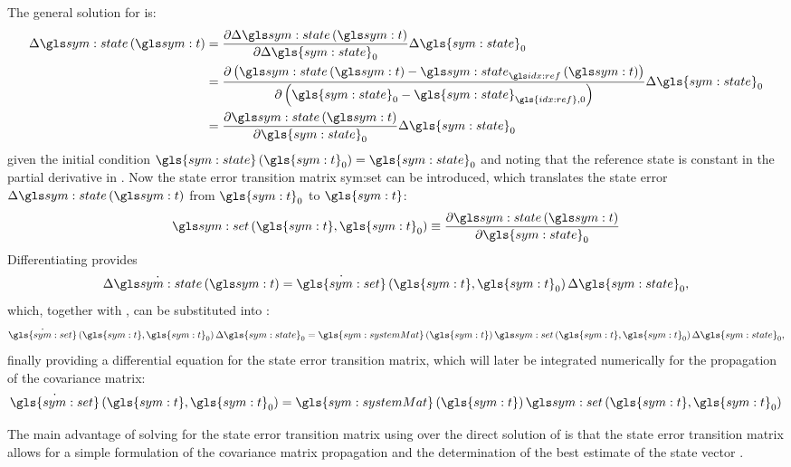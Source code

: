 The general solution for  is:
\begin{align}
 \Delta \xt &= \frac{\partial \Delta \xt}{\partial \Delta\gls{sym:state}_0} \Delta \gls{sym:state}_0 \\
            &= \frac{\partial \left(\xt - \xref\right)}{\partial \left(\gls{sym:state}_0 - \gls{sym:state}_{\gls{idx:ref},0}\right)} \Delta \gls{sym:state}_0 
\label{eq:ref-constant}\\
            &= \frac{\partial \xt}{\partial \gls{sym:state}_0} \Delta \gls{sym:state}_0 \label{eq:set-homo}
\end{align}
given the initial condition $\gls{sym:state}\left(\gls{sym:t}_0\right)=\gls{sym:state}_0$ and noting that the reference state is constant in the partial derivative in
. Now the state error transition matrix \gls{sym:set} can be introduced, which translates the state error $\Delta \xt$ from $\gls{sym:t}_0$ to $\gls{sym:t}$:
\begin{equation}
 \set{\gls{sym:t}}{\gls{sym:t}_0} \equiv \frac{\partial \xt}{\partial \gls{sym:state}_0}
\end{equation}
Differentiating  provides
\begin{equation}
 \Delta \xdot = \dot{\gls{sym:set}}\left(\gls{sym:t},\gls{sym:t}_0\right) \Delta \gls{sym:state}_0,
\end{equation}
which, together with , can be substituted into :
\begin{equation}
 \dot{\gls{sym:set}}\left(\gls{sym:t},\gls{sym:t}_0\right) \Delta \gls{sym:state}_0 = \gls{sym:systemMat}\left(\gls{sym:t}\right)
\set{\gls{sym:t}}{\gls{sym:t}_0} \Delta \gls{sym:state}_0,
\end{equation}
finally providing a differential equation for the state error transition matrix, which will later be integrated numerically for the propagation of the covariance matrix:
\begin{equation}
 \dot{\gls{sym:set}}\left(\gls{sym:t},\gls{sym:t}_0\right) = \gls{sym:systemMat}\left(\gls{sym:t}\right) \set{\gls{sym:t}}{\gls{sym:t}_0} \label{eq:set-ode}
\end{equation}

The main advantage of solving for the state error transition matrix using  over the direct solution of  
is that the state error transition matrix allows for a simple formulation of the covariance matrix propagation and the determination of 
the best estimate of the state vector \citep{tapley2004}.

